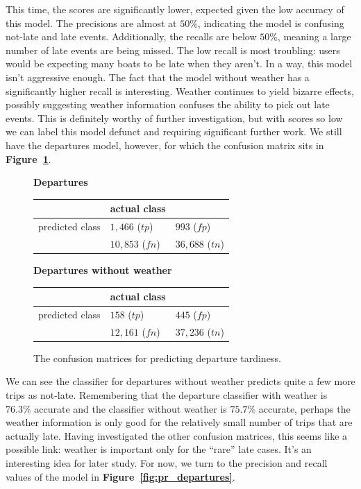 \documentclass[11pt]{article} %
\begin{document}
This time, the scores are significantly lower, expected given the low accuracy
of this model. The precisions are almost at $50\%$, indicating the model is
confusing not-late and late events. Additionally, the recalls are below 
$50\%$, meaning a large number of late events are being missed. The low recall
is most troubling: users would be expecting many boats to be late when
they aren't. In a way, this model isn't aggressive enough. The fact that 
the model without weather has a significantly higher recall is interesting. 
Weather continues to yield bizarre effects, possibly suggesting weather
information confuses the ability to pick out late events. This is definitely
worthy of further investigation, but with scores so low we can label this 
model defunct and requiring significant further work.  We still have the 
departures model, however, for which the confusion matrix sits in
\textbf{Figure~\ref{fig:confusion_departures}}.


\begin{figure}
    \textbf{Departures}

    \begin{tabular}[h]{l|ll}
                         & actual class &  \\
         \hline
         predicted class & $1,466$ ($tp$)& $993$ ($fp$)\\
                         & $10,853$ ($fn$)& $36,688$ ($tn$)\\
    \end{tabular}

    \textbf{Departures without weather}

    \begin{tabular}[h]{l|ll}
                         & actual class &  \\
         \hline
         predicted class & $158$ ($tp$)& $445$ ($fp$)\\
                         & $12,161$ ($fn$)& $37,236$ ($tn$)\\
    \end{tabular}
    \caption{The confusion matrices for predicting departure tardiness.}
    \label{fig:confusion_departures}
\end{figure}

We can see the classifier for departures without weather predicts quite 
a few more trips 
as not-late. Remembering that the departure classifier with weather is $76.3\%$ 
accurate and the classifier without weather is $75.7\%$ accurate, perhaps the
weather information is only good for the relatively small number of trips that 
are actually late. Having investigated the other confusion matrices, this seems
like a possible link: weather is important only for the ``rare'' late cases. 
It's an interesting idea for later study. For now, we turn to the precision and
recall values of the model in \textbf{Figure~\ref{fig:pr_departures}}.
\end{document}
